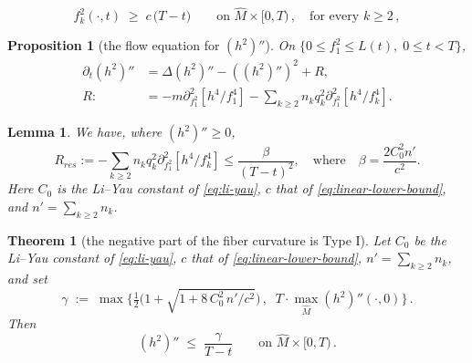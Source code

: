 \documentclass[10pt,a4paper]{amsart}
\newtheorem{proposition}{Proposition}
\newtheorem{lemma}{Lemma}
\newtheorem{theorem}{Theorem}
\begin{document}
	\begin{equation}\label{eq:linear-lower-bound}
		f_k^2 (\cdot, t) \;\geq\; c\, \big( T - t \big) \qquad \text{on } \widehat{M} \times [0, T) \,, \quad \text{for every } k \geq 2 \,,
	\end{equation}

\begin{proposition}[the flow equation for $(h^2)''$]\label{prop:h2pp-evolution}
	On $\{ 0 \leq f_1^2 \leq L (t) ,\; 0 \leq t < T \}$,
	\begin{align}\label{eq:h2pp-evolution}
		\partial_t (h^2)'' &=\Delta (h^2)'' - ((h^2)'')^2 + R,\\
		R :&= -m \partial^2_{f_1^2} [ h^4/f_1^4 ] - \sum_{k \ge 2} n_k q_k^2 \partial^2_{f_1^2} [ h^4/f_k^4 ].\nonumber
	\end{align}
\end{proposition}

\begin{lemma} \label{lem:residual-source-bound}
	We have, where $(h^2)'' \ge 0$,
	\[R_{res} := -\sum_{k \ge 2} n_k q_k^2 \partial^2_{f_1^2} [ h^4/f_k^4 ] \le \frac{\beta}{(T-t)^2}, \quad \text{where} \quad \beta = \frac{2C_0^2 n'}{c^2}.\]
	Here $C_0$ is the Li--Yau constant of \eqref{eq:li-yau}, $c$ that of \eqref{eq:linear-lower-bound}, and $n' = \sum_{k \geq 2} n_k$.
\end{lemma}

\begin{theorem}[the negative part of the fiber curvature is Type I]\label{thm:h2pp-upper-bound}
	Let $C_0$ be the Li--Yau constant of \eqref{eq:li-yau}, $c$ that of \eqref{eq:linear-lower-bound}, $n' = \sum_{k \geq 2} n_k$, and set
	\[
	\gamma \;:=\; \max \Big\{ \tfrac{1}{2} \Big( 1 + \sqrt{ 1 + 8\, C_0^2\, n' / c^2 } \Big) \,,\;\; T \cdot \max_{\widehat{M}} ( h^2 )'' ( \cdot, 0 ) \Big\} \,.
	\]
	Then
	\begin{equation}\label{eq:h2pp-upper-bound}
		( h^2 )'' \;\leq\; \frac{\gamma}{T - t} \qquad \text{on } \widehat{M} \times [ 0, T ) \,.
	\end{equation}
	
\end{theorem}
\end{document}

